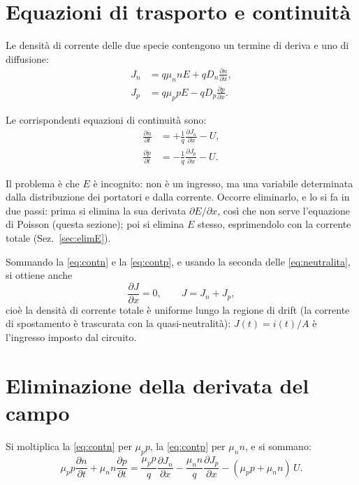 \documentclass[11pt,a4paper]{article}
\newcommand{\dpar}[2]{\frac{\partial #1}{\partial #2}}
\begin{document}
\section{Equazioni di trasporto e continuit\`a}

Le densit\`a di corrente delle due specie contengono un termine di deriva e uno di
diffusione:
\begin{align}
  J_n &= q\mu_n n E + qD_n \dpar{n}{x}, \label{eq:Jn}\\
  J_p &= q\mu_p p E - qD_p \dpar{p}{x}. \label{eq:Jp}
\end{align}

Le corrispondenti equazioni di continuit\`a sono:
\begin{align}
  \dpar{n}{t} &= +\frac{1}{q}\dpar{J_n}{x} - U, \label{eq:contn}\\
  \dpar{p}{t} &= -\frac{1}{q}\dpar{J_p}{x} - U. \label{eq:contp}
\end{align}

Il problema \`e che $E$ \`e incognito: non \`e un ingresso, ma una variabile
determinata dalla distribuzione dei portatori e dalla corrente. Occorre eliminarlo, e
lo si fa in due passi: prima si elimina la sua derivata $\partial E/\partial x$, cos\`i
che non serve l'equazione di Poisson (questa sezione); poi si elimina $E$ stesso,
esprimendolo con la corrente totale (Sez.~\ref{sec:elimE}).

Sommando la \eqref{eq:contn} e la \eqref{eq:contp}, e usando la seconda delle
\eqref{eq:neutralita}, si ottiene anche
\begin{equation}
  \dpar{J}{x} = 0, \qquad J = J_n + J_p ,
  \label{eq:Juniforme}
\end{equation}
cio\`e la densit\`a di corrente totale \`e uniforme lungo la regione di drift (la
corrente di spostamento \`e trascurata con la quasi-neutralit\`a): $J(t) = i(t)/A$
\`e l'ingresso imposto dal circuito.

\section{Eliminazione della derivata del campo}

Si moltiplica la \eqref{eq:contn} per $\mu_p p$, la \eqref{eq:contp} per $\mu_n n$, e
si sommano:
\begin{equation}
  \mu_p p \dpar{n}{t} + \mu_n n \dpar{p}{t}
  = \frac{\mu_p p}{q}\dpar{J_n}{x} - \frac{\mu_n n}{q}\dpar{J_p}{x}
    - (\mu_p p + \mu_n n)\,U .
  \label{eq:combinata}
\end{equation}
\end{document}
